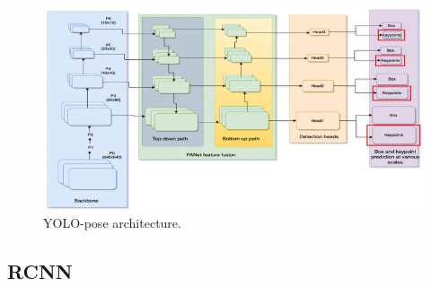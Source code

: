 \begin{figure}[ht]
  \centering
  \includegraphics[scale=1]{gambar/yolo-architecture.png}
  \caption{YOLO-pose architecture.}
  \label{fig:YOLO-pose-architecture}
\end{figure}

\subsection{RCNN}
\label{subsec:rcnn}